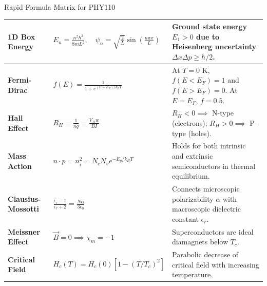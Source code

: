 \begin{formulabox}{Rapid Formula Matrix for PHY110}
\begin{tabularx}{\textwidth}{l X X}
\textbf{1D Box Energy} & $E_n = \frac{n^2 h^2}{8mL^2}, \quad \psi_n = \sqrt{\frac{2}{L}}\sin(\frac{n\pi x}{L})$ & Ground state energy $E_1 > 0$ due to Heisenberg uncertainty $\Delta x \Delta p \ge \hbar/2$. \\
\midrule
\textbf{Fermi-Dirac} & $f(E) = \frac{1}{1 + e^{(E-E_F)/k_B T}}$ & At $T=0\text{ K}$, $f(E<E_F)=1$ and $f(E>E_F)=0$. At $E=E_F$, $f=0.5$. \\
\textbf{Hall Effect} & $R_H = \frac{1}{n q} = \frac{V_H w}{B I}$ & $R_H < 0 \implies$ N-type (electrons); $R_H > 0 \implies$ P-type (holes). \\
\textbf{Mass Action} & $n \cdot p = n_i^2 = N_c N_v e^{-E_g/k_B T}$ & Holds for both intrinsic and extrinsic semiconductors in thermal equilibrium. \\
\midrule
\textbf{Clausius-Mossotti} & $\frac{\epsilon_r - 1}{\epsilon_r + 2} = \frac{N\alpha}{3\epsilon_0}$ & Connects microscopic polarizability $\alpha$ with macroscopic dielectric constant $\epsilon_r$. \\
\textbf{Meissner Effect} & $\vec{B} = 0 \implies \chi_m = -1$ & Superconductors are ideal diamagnets below $T_c$. \\
\textbf{Critical Field} & $H_c(T) = H_c(0)[1 - (T/T_c)^2]$ & Parabolic decrease of critical field with increasing temperature. \\
\bottomrule
\end{tabularx}
\end{formulabox}
